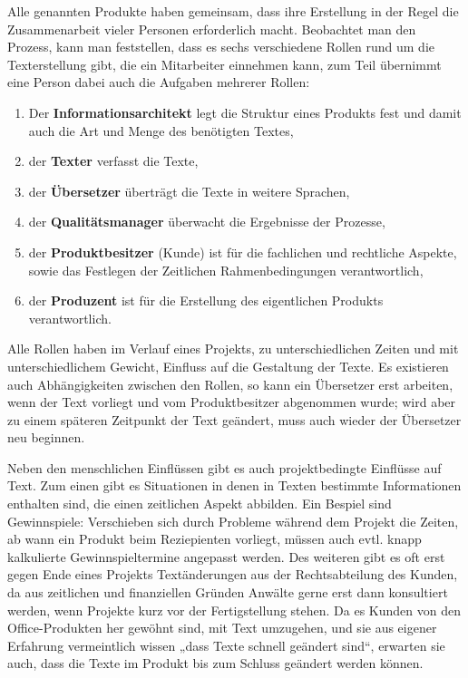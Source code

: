 \documentclass[11pt,a4paper]{article}
\begin{document}
Alle genannten Produkte haben gemeinsam, dass ihre Erstellung in der Regel die Zusammenarbeit vieler Personen erforderlich macht. Beobachtet man den Prozess, kann man feststellen, dass es sechs verschiedene Rollen rund um die Texterstellung gibt, die ein Mitarbeiter einnehmen kann, zum Teil übernimmt eine Person dabei auch die Aufgaben mehrerer Rollen:
\begin{enumerate}
\addtolength{\itemsep}{-0.5\baselineskip}
\item Der \textbf{Informationsarchitekt} legt die Struktur eines Produkts fest und damit auch die Art und Menge des benötigten Textes,
\item der \textbf{Texter} verfasst die Texte,
\item der \textbf{Übersetzer} überträgt die Texte in weitere Sprachen,
\item der \textbf{Qualitätsmanager} überwacht die Ergebnisse der Prozesse,
\item der \textbf{Produktbesitzer} (Kunde) ist für die fachlichen und rechtliche Aspekte, sowie das Festlegen der Zeitlichen Rahmenbedingungen verantwortlich,
\item der \textbf{Produzent} ist für die Erstellung des eigentlichen Produkts verantwortlich.
\end{enumerate}
Alle Rollen haben im Verlauf eines Projekts, zu unterschiedlichen Zeiten und mit unterschiedlichem Gewicht, Einfluss auf die Gestaltung der Texte. Es existieren auch Abhängigkeiten zwischen den Rollen, so kann ein Übersetzer erst arbeiten, wenn der Text vorliegt und vom Produktbesitzer abgenommen wurde; wird aber zu einem späteren Zeitpunkt der Text geändert, muss auch wieder der Übersetzer neu beginnen.

Neben den menschlichen Einflüssen gibt es auch projektbedingte Einflüsse auf Text. Zum einen gibt es Situationen in denen in Texten bestimmte Informationen enthalten sind, die einen zeitlichen Aspekt abbilden. Ein Bespiel sind Gewinnspiele: Verschieben sich durch Probleme während dem Projekt die Zeiten, ab wann ein Produkt beim Reziepienten vorliegt, müssen auch evtl. knapp kalkulierte Gewinnspieltermine angepasst werden. Des weiteren gibt es oft erst gegen Ende eines Projekts Textänderungen aus der Rechtsabteilung des Kunden, da aus zeitlichen und finanziellen Gründen Anwälte gerne erst dann konsultiert werden, wenn Projekte kurz vor der Fertigstellung stehen. Da es Kunden von den Office-Produkten her gewöhnt sind, mit Text umzugehen, und sie aus eigener Erfahrung vermeintlich wissen „dass Texte schnell geändert sind“, erwarten sie auch, dass die Texte im Produkt bis zum Schluss geändert werden können.
\end{document}
